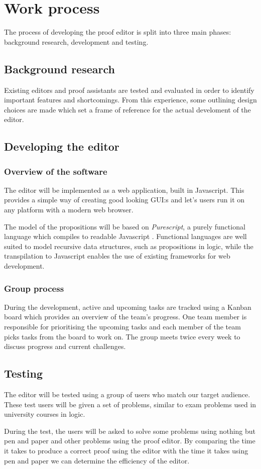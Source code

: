 \section{Work process}
The process of developing the proof editor is split into three main phases:
background research, development and testing.

\subsection{Background research}
Existing editors and proof assistants are tested and evaluated in order to identify important features and shortcomings. From this experience, some outlining design choices are made which set a frame of reference for the actual develoment of the editor.

\subsection{Developing the editor}

\subsubsection{Overview of the software}
The editor will be implemented as a web application, built in Javascript. This provides a simple way of creating good looking GUI:s and let's users run it on any platform with a modern web browser.

The model of the propositions will be based on \textit{Purescript}, a purely functional language which compiles to readable Javascript \cite{purescript}. Functional languages are well suited to model recursive data structures, such as propositions in logic, while the transpilation to Javascript enables the use of existing frameworks for web development.

\subsubsection{Group process}
During the development, active and upcoming tasks are tracked using a Kanban board which provides an overview of the team's progress. One team member is responsible for prioritising the upcoming tasks and each member of the team picks tasks from the board to work on. The group meets twice every week to discuss progress and current challenges.

\subsection{Testing}
The editor will be tested using a group of users who match our target audience. These test users will be given a set of problems, similar to exam problems used in university courses in logic.

During the test, the users will be asked to solve some problems using nothing
but pen and paper and other problems using the proof editor. By comparing the
time it takes to produce a correct proof using the editor with the time it takes
using pen and paper we can determine the efficiency of the editor.